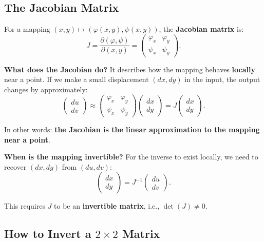 \documentclass[11pt]{report}
\begin{document}
\subsection{The Jacobian Matrix}

\begin{definition}
For a mapping $(x, y) \mapsto (\varphi(x,y), \psi(x,y))$, the \textbf{Jacobian matrix} is:
\[
J = \frac{\partial(\varphi, \psi)}{\partial(x, y)} = \begin{pmatrix} \varphi_x & \varphi_y \\ \psi_x & \psi_y \end{pmatrix}.
\]
\end{definition}

\textbf{What does the Jacobian do?} It describes how the mapping behaves \textbf{locally} near a point. If we make a small displacement $(dx, dy)$ in the input, the output changes by approximately:
\[
\begin{pmatrix} du \\ dv \end{pmatrix} \approx \begin{pmatrix} \varphi_x & \varphi_y \\ \psi_x & \psi_y \end{pmatrix} \begin{pmatrix} dx \\ dy \end{pmatrix} = J \begin{pmatrix} dx \\ dy \end{pmatrix}.
\]

In other words: \textbf{the Jacobian is the linear approximation to the mapping near a point}.

\textbf{When is the mapping invertible?} For the inverse to exist locally, we need to recover $(dx, dy)$ from $(du, dv)$:
\[
\begin{pmatrix} dx \\ dy \end{pmatrix} = J^{-1} \begin{pmatrix} du \\ dv \end{pmatrix}.
\]

This requires $J$ to be an \textbf{invertible matrix}, i.e., $\det(J) \neq 0$.

\subsection*{How to Invert a $2 \times 2$ Matrix}
\end{document}
